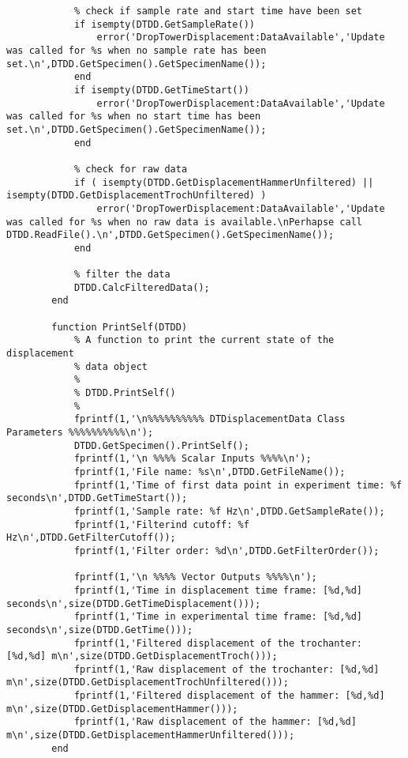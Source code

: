 \begin{lstlisting}
            % check if sample rate and start time have been set
            if isempty(DTDD.GetSampleRate())
                error('DropTowerDisplacement:DataAvailable','Update was called for %s when no sample rate has been set.\n',DTDD.GetSpecimen().GetSpecimenName());
            end
            if isempty(DTDD.GetTimeStart())
                error('DropTowerDisplacement:DataAvailable','Update was called for %s when no start time has been set.\n',DTDD.GetSpecimen().GetSpecimenName());
            end
            
            % check for raw data
            if ( isempty(DTDD.GetDisplacementHammerUnfiltered) || isempty(DTDD.GetDisplacementTrochUnfiltered) )
                error('DropTowerDisplacement:DataAvailable','Update was called for %s when no raw data is available.\nPerhapse call DTDD.ReadFile().\n',DTDD.GetSpecimen().GetSpecimenName());
            end
            
            % filter the data
            DTDD.CalcFilteredData();
        end
        
        function PrintSelf(DTDD)
            % A function to print the current state of the displacement
            % data object
            %
            % DTDD.PrintSelf()
            %
            fprintf(1,'\n%%%%%%%%%% DTDisplacementData Class Parameters %%%%%%%%%%\n');
            DTDD.GetSpecimen().PrintSelf();
            fprintf(1,'\n %%%% Scalar Inputs %%%%\n');
            fprintf(1,'File name: %s\n',DTDD.GetFileName());
            fprintf(1,'Time of first data point in experiment time: %f seconds\n',DTDD.GetTimeStart());
            fprintf(1,'Sample rate: %f Hz\n',DTDD.GetSampleRate());
            fprintf(1,'Filterind cutoff: %f Hz\n',DTDD.GetFilterCutoff());
            fprintf(1,'Filter order: %d\n',DTDD.GetFilterOrder());
            
            fprintf(1,'\n %%%% Vector Outputs %%%%\n');
            fprintf(1,'Time in displacement time frame: [%d,%d] seconds\n',size(DTDD.GetTimeDisplacement()));
            fprintf(1,'Time in experimental time frame: [%d,%d] seconds\n',size(DTDD.GetTime()));
            fprintf(1,'Filtered displacement of the trochanter: [%d,%d] m\n',size(DTDD.GetDisplacementTroch()));
            fprintf(1,'Raw displacement of the trochanter: [%d,%d] m\n',size(DTDD.GetDisplacementTrochUnfiltered()));
            fprintf(1,'Filtered displacement of the hammer: [%d,%d] m\n',size(DTDD.GetDisplacementHammer()));
            fprintf(1,'Raw displacement of the hammer: [%d,%d] m\n',size(DTDD.GetDisplacementHammerUnfiltered()));
        end
            

\end{lstlisting}
